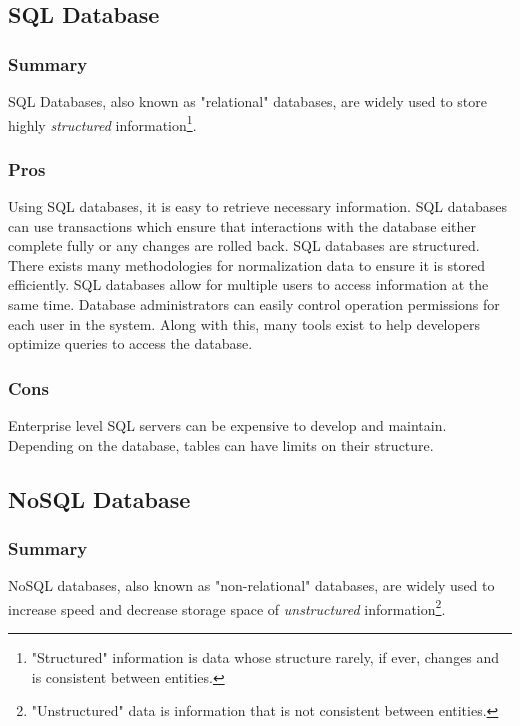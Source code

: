 \documentclass[draftclsnofoot,onecolumn,letterpaper,10pt,compsoc]{IEEEtran}
\begin{document}
	\subsection{SQL Database}
        \subsubsection{Summary}
            SQL Databases, also known as "relational" databases, are widely used to store highly \textit{structured} information\footnote{"Structured" information is data whose structure rarely, if ever, changes and is consistent between entities.}.
        
        \subsubsection{Pros}
            Using SQL databases, it is easy to retrieve necessary information.
            SQL databases can use transactions which ensure that interactions with the database either complete fully or any changes are rolled back.
            SQL databases are structured.
            There exists many methodologies for normalization data to ensure it is stored efficiently\cite{TechwallaSQL}.
            SQL databases allow for multiple users to access information at the same time\cite{TechwallaSQLPros}.
            Database administrators can easily control operation permissions for each user in the system.
            Along with this, many tools exist to help developers optimize queries to access the database.
    
        \subsubsection{Cons}
            Enterprise level SQL servers can be expensive to develop and maintain.
            Depending on the database, tables can have limits on their structure\cite{TechwallaSQLCons}.

        
	\subsection{NoSQL Database}
        \subsubsection{Summary}
            NoSQL databases, also known as "non-relational" databases, are widely used to increase speed and decrease storage space of \textit{unstructured} information\footnote{"Unstructured" data is information that is not consistent between entities.}.
        
\end{document}
